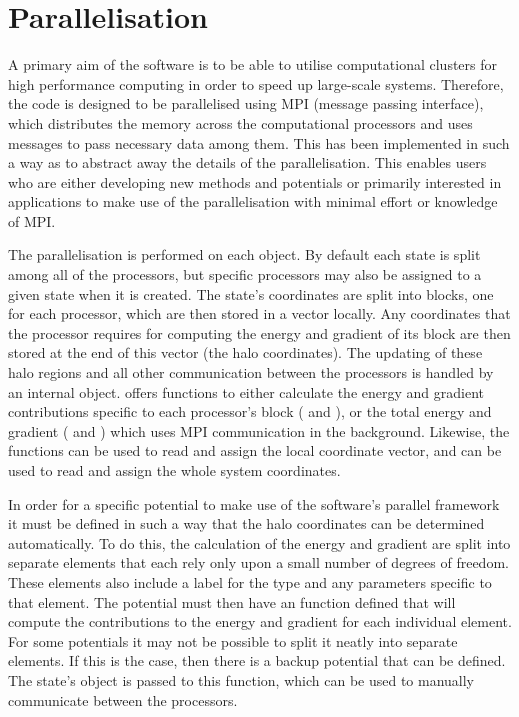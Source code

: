 \section{Parallelisation}\label{sec:ell-parallel}
A primary aim of the software is to be able to utilise computational clusters for high performance computing in order to speed up large-scale systems.
Therefore, the code is designed to be parallelised using MPI (message passing interface), which distributes the memory across the computational processors and uses messages to pass necessary data among them.
This has been implemented in such a way as to abstract away the details of the parallelisation.
This enables users who are either developing new methods and potentials or primarily interested in applications to make use of the parallelisation with minimal effort or knowledge of MPI.

The parallelisation is performed on each  object.
By default each state is split among all of the processors, but specific processors may also be assigned to a given state when it is created.
The state's coordinates are split into blocks, one for each processor, which are then stored in a vector locally.
Any coordinates that the processor requires for computing the energy and gradient of its block are then stored at the end of this vector (the halo coordinates).
The updating of these halo regions and all other communication between the processors is handled by an internal  object.
 offers functions to either calculate the energy and gradient contributions specific to each processor's block ( and ), or the total energy and gradient ( and ) which uses MPI communication in the background.
Likewise, the  functions can be used to read and assign the local coordinate vector, and  can be used to read and assign the whole system coordinates.

In order for a specific potential to make use of the software's parallel framework it must be defined in such a way that the halo coordinates can be determined automatically.
To do this, the calculation of the energy and gradient are split into separate elements that each rely only upon a small number of degrees of freedom.
These elements also include a label for the type and any parameters specific to that element.
The potential must then have an  function defined that will compute the contributions to the energy and gradient for each individual element.
For some potentials it may not be possible to split it neatly into separate elements.
If this is the case, then there is a backup  potential that can be defined.
The state's  object is passed to this function, which can be used to manually communicate between the processors.


